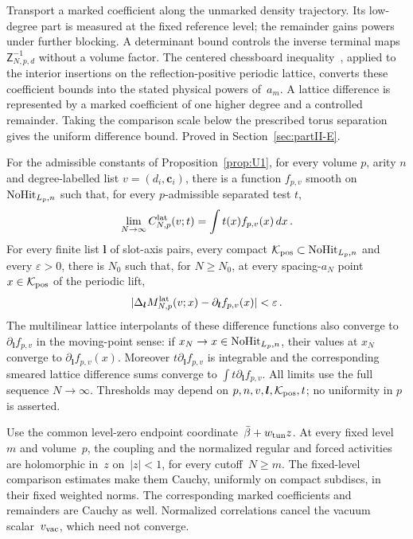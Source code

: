 Transport a marked coefficient along the unmarked density trajectory.
Its low-degree part is measured at the fixed reference level; the remainder
gains powers under further blocking. A determinant bound controls the
inverse terminal maps~$\mathsf Z_{N,p,d}^{-1}$ without a volume factor. The centered chessboard
inequality~\cite[Theorem~4.1]{FrohlichIsraelLiebSimon1978}, applied to the interior insertions on the reflection-positive periodic lattice, converts these coefficient bounds into the stated physical powers
of~$a_m$. A lattice difference is represented by a marked coefficient of one
higher degree and a controlled remainder. Taking the comparison scale below
the prescribed torus separation gives the uniform difference bound.
Proved in Section~\ref{sec:partII-E}.

\begin{proposition}\label{prop:U4}
For the admissible constants of Proposition~\ref{prop:U1}, for every volume $p$, arity $n$ and degree-labelled list $v=(d_i,\mathbf c_i)$, there is a function $f_{p,v}$ smooth on $\mathrm{NoHit}_{L_p,n}$ such that, for every $p$-admissible separated test $t$,
\begin{equation}\label{eq:U4-1}
\lim_{N\to\infty}C^{\mathrm{lat}}_{N,p}(v;t)=\int t(x)f_{p,v}(x)\,dx\,.
\end{equation}
For every finite list $\boldsymbol l$ of slot-axis pairs, every compact $\mathcal K_{\rm pos}\subset\mathrm{NoHit}_{L_p,n}$ and every $\varepsilon>0$, there is $N_0$ such that, for $N\ge N_0$, at every spacing-$a_N$ point $x\in\mathcal K_{\rm pos}$ of the periodic lift,
\begin{equation}\label{eq:U4-2}
|\Delta_{\boldsymbol l}M^{\mathrm{lat}}_{N,p}(v;x)-\partial_{\boldsymbol l}f_{p,v}(x)|<\varepsilon\,.
\end{equation}
The multilinear lattice interpolants of these difference functions also converge to $\partial_{\boldsymbol l}f_{p,v}$ in the moving-point sense: if $x_N\to x\in\mathrm{NoHit}_{L_p,n}$, their values at $x_N$ converge to $\partial_{\boldsymbol l}f_{p,v}(x)$. Moreover $t\partial_{\boldsymbol l}f_{p,v}$ is integrable and the corresponding smeared lattice difference sums converge to $\int t\partial_{\boldsymbol l}f_{p,v}$. All limits use the full sequence $N\to\infty$. Thresholds may depend on $p,n,v,\boldsymbol l,\mathcal K_{\rm pos},t$; no uniformity in $p$ is asserted.
\end{proposition}

Use the common level-zero endpoint coordinate~$\bar\beta+w_{\rm tun}z$. At every fixed level~$m$ and volume~$p$, the coupling and the normalized regular and forced activities are holomorphic in~$z$ on~$|z|<1$, for every cutoff~$N\ge m$. The fixed-level comparison estimates make them Cauchy, uniformly on compact subdiscs, in their fixed weighted norms. The corresponding marked coefficients and remainders are Cauchy as well. Normalized correlations cancel the vacuum scalar~$v_{\rm vac}$, which need not converge.


